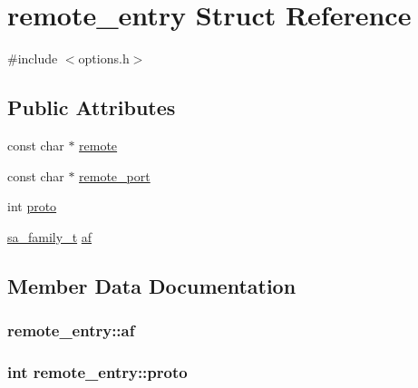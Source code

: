 \hypertarget{structremote__entry}{}\section{remote\+\_\+entry Struct Reference}
\label{structremote__entry}


{\ttfamily \#include $<$options.\+h$>$}

\subsection*{Public Attributes}
\begin{DoxyCompactItemize}
\item 
const char $\ast$ \hyperlink{structremote__entry_a4203205fd2cd785742e7eb57cd4d8d55}{remote}
\item 
const char $\ast$ \hyperlink{structremote__entry_a5be40d535585fa7721ad095b1ede3bc4}{remote\+\_\+port}
\item 
int \hyperlink{structremote__entry_a1b9358c67a9c3e60d1988aed993967bf}{proto}
\item 
\hyperlink{syshead_8h_a27a82860cef19f4a53f68516e7b2ee0e}{sa\+\_\+family\+\_\+t} \hyperlink{structremote__entry_a7a332696e31e6de02db70b59807e2d07}{af}
\end{DoxyCompactItemize}


\subsection{Member Data Documentation}
\hypertarget{structremote__entry_a7a332696e31e6de02db70b59807e2d07}{}
\subsubsection[{af}]{ remote\+\_\+entry\+::af}\label{structremote__entry_a7a332696e31e6de02db70b59807e2d07}
\hypertarget{structremote__entry_a1b9358c67a9c3e60d1988aed993967bf}{}
\subsubsection[{proto}]{\setlength{\rightskip}{0pt plus 5cm}int remote\+\_\+entry\+::proto}\label{structremote__entry_a1b9358c67a9c3e60d1988aed993967bf}
\hypertarget{structremote__entry_a4203205fd2cd785742e7eb57cd4d8d55}{}
